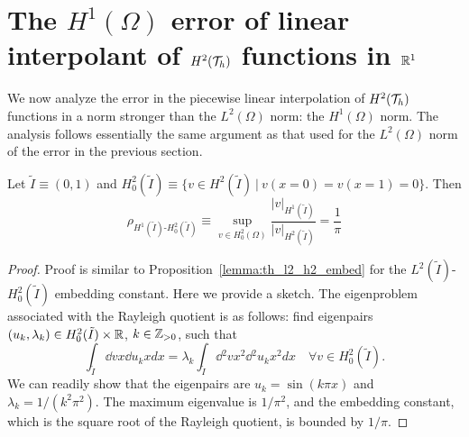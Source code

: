 \section{The $H^1(\Omega)$ error of linear interpolant of $H^2(\mathcal{T}_h)$ functions in $\mathbb{R}^1$}
\label{sec:th_interp_h1_h2}
  We now analyze the error in the piecewise linear interpolation of $H^2(\mathcal{T}_h)$ functions in a norm stronger than the $L^2(\Omega)$ norm: the $H^1(\Omega)$ norm.  The analysis follows essentially the same argument as that used for the $L^2(\Omega)$ norm of the error in the previous section.
\begin{lemma}
  \label{lemma:th_h1_h2_embed}
  Let $\tilde I \equiv (0,1)$ and $H^2_0(\tilde I) \equiv \{ v \in H^2(\tilde I) \ | \ v(x=0) = v(x=1) = 0 \}$. Then 
  \begin{equation*}
    \rho_{H^1(\tilde I)\text{-}H^2_0(\tilde I)} \equiv \sup_{v \in H^2_0(\Omega)} \frac{| v |_{H^1(\tilde I)}}{| v |_{H^2(\tilde I)}} = \frac{1}{\pi}
  \end{equation*}
  \begin{proof}
    Proof is similar to Proposition~\ref{lemma:th_l2_h2_embed} for the $L^2(\tilde I)$-$H^2_0(\tilde I)$ embedding constant. Here we provide a sketch. The eigenproblem associated with the Rayleigh quotient is as follows: find eigenpairs $(u_k,\lambda_k) \in H^2_0(\tilde I) \times \mathbb{R}$, $k \in \mathbb{Z}_{> 0}$, such that
    \begin{equation*}
      \int_{\tilde I} \dd{v}{x} \dd{u_k}{x} dx
      = \lambda_k \int_{\tilde I} \dd{^2v}{x^2} \dd{^2u_k}{x^2} dx \quad \forall v \in H^2_0(\tilde I).
    \end{equation*}
    We can readily show that the eigenpairs are $u_k = \sin(k \pi x)$ and $\lambda_k = 1/ (k^2 \pi^2)$.  The maximum eigenvalue is $1/\pi^2$, and the embedding constant, which is the square root of the Rayleigh quotient, is bounded by $1/\pi$.
  \end{proof}
\end{lemma}
